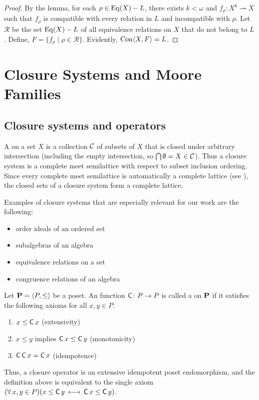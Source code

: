 \begin{proof}
  By the lemma, for each $\rho \in \operatorname{Eq}(X) - L$, there exists $k< \omega$ and
  $f_\rho \colon  X^k \rightharpoonup X$ such that $f_\rho$ is compatible with every relation in
  $L$ and incompatible with $\rho$.  Let $\mathcal{R}$ be the set $\operatorname{Eq}(X) - L$ of
  all equivalence relations on $X$ that do not belong to $L$.  Define,
  $F = \{f_\rho \mid \rho \in \mathcal{R}\}$.  Evidently, $\operatorname{Con} \langle X, F\rangle = L$.
\end{proof}

\section{Closure Systems and Moore Families}
\label{sec:more-gener-appr}

\subsection{Closure systems and operators}
A  on a set $X$ is a collection $\mathcal{C}$
of subsets of $X$ that is closed under arbitrary intersection (including the empty 
intersection, so $\bigcap \emptyset = X \in \mathcal{C}$). 
Thus a closure system is a complete meet semilattice with respect to subset
inclusion ordering. 
Since every complete meet semilattice is automatically a complete lattice
(see \cite[Theorem 2.5]{Nation-notes}), 
the closed sets of a closure system form a complete lattice. 

Examples of closure systems that are especially relevant for our work are the following:
\begin{itemize}
\item order ideals of an ordered set
\item subalgebras of an algebra 
\item equivalence relations on a set
\item congruence relations of an algebra
\end{itemize}

\newcommand{\cl}{\ensuremath{\operatorname{\sansC}}}

Let $\mathbf{P} = \langle P, \leq \rangle$ be a poset.
An function $\cl \colon P \to P$ is called a  on $\mathbf{P}$
if it satisfies the following axioms for all $x, y\in P$.
\begin{enumerate}
\item $x \leq \cl x$ (extensivity) 
\item $x \leq y$ implies $\cl x \leq \cl y$ (monotonicity) 
\item $\cl \cl x = \cl x$ (idempotence) 
\end{enumerate}
Thus, a closure operator is an extensive idempotent poset endomorphism,
and the definition above is equivalent to the single axiom
$(\forall\, x, y \in P) (x \leq \cl y \, \longleftrightarrow  \, \cl x \leq  \cl y)$.


